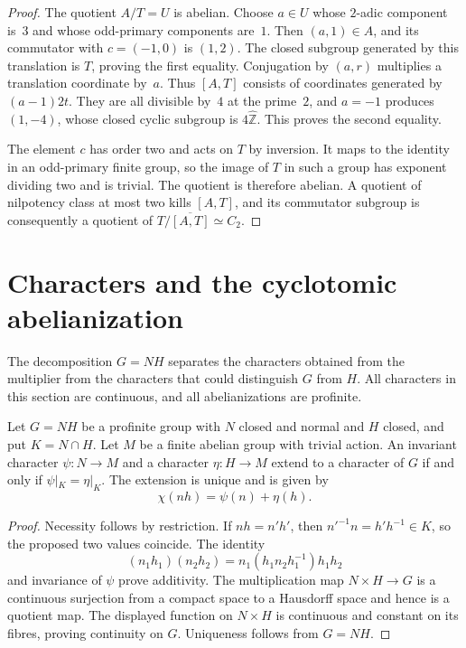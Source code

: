 \begin{proof}
The quotient $A/T=U$ is abelian. Choose $a\in U$ whose $2$-adic
component is~$3$ and whose odd-primary components are~$1$.
Then $(a,1)\in A$, and its commutator with $c=(-1,0)$ is $(1,2)$.
The closed subgroup generated by this translation is $T$, proving the first
equality. Conjugation by $(a,r)$ multiplies a translation coordinate by~$a$.
Thus $[A,T]$ consists of coordinates generated by $(a-1)2t$.
They are all divisible by~$4$ at the prime~$2$, and $a=-1$ produces
$(1,-4)$, whose closed cyclic subgroup is $4\widehat{\mathbb Z}$.
This proves the second equality.

The element $c$ has order two and acts on $T$ by inversion. It maps to the
identity in an odd-primary finite group, so the image of $T$ in such a
group has exponent dividing two and is trivial. The quotient is therefore
abelian. A quotient of nilpotency class at most two kills $[A,T]$, and its
commutator subgroup is consequently a quotient of
$T/\overline{[A,T]}\simeq C_2$.
\end{proof}

\section{Characters and the cyclotomic abelianization}
\label{sec:characters-abelianization}

The decomposition $G=NH$ separates the characters obtained from the multiplier
from the characters that could distinguish $G$ from $H$. All characters
in this section are continuous, and all abelianizations are profinite.

\begin{lemma}\label{lem:character-gluing}
Let $G=NH$ be a profinite group with $N$ closed and normal and $H$ closed,
and put $K=N\cap H$. Let $M$ be a finite abelian group with trivial action.
An invariant character $\psi:N\to M$ and a character $\eta:H\to M$
extend to a character of $G$ if and only if $\psi|_K=\eta|_K$.
The extension is unique and is given by
\[
 \chi(nh)=\psi(n)+\eta(h).
\]
\end{lemma}

\begin{proof}
Necessity follows by restriction. If $nh=n'h'$, then
$n'^{-1}n=h'h^{-1}\in K$, so the proposed two values coincide.
The identity
\[
 (n_1h_1)(n_2h_2)=n_1(h_1n_2h_1^{-1})h_1h_2
\]
and invariance of $\psi$ prove additivity. The multiplication map
$N\times H\to G$ is a continuous surjection from a compact space to a
Hausdorff space and hence is a quotient map. The displayed function on
$N\times H$ is continuous and constant on its fibres, proving continuity
on $G$. Uniqueness follows from $G=NH$.
\end{proof}

